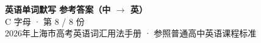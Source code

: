\documentclass[10pt,a4paper]{article}
\begin{document}
\pagestyle{plain}

\begin{center}
{\LARGE\bfseries 英语单词默写 \quad 参考答案（中 $\to$ 英）}\\[0.22em]
{\large C 字母 · 第 8 / 8 份}\\[0.18em]
{\small 2026年上海市高考英语词汇用法手册 · 参照普通高中英语课程标准}
\end{center}

\vspace{0.2em}
\noindent{\color{rulegray}\rule{\textwidth}{0.8pt}}

\vspace{0.35em}

\vspace{0.25em}
\renewcommand{\arraystretch}{1.32}
\end{document}

